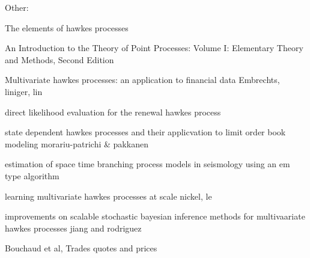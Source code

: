 \documentclass[honours,12pt]{unswthesis}
\newcommand{\CC}{\mathcal{C}}
\numberwithin{equation}{section}
\begin{document}
\begin{thebibliography}{999}
%
%
%
%
%
%
%
%
%
%
%


Other:

The elements of hawkes processes

An Introduction to the Theory of Point Processes: Volume I: Elementary Theory and Methods, Second Edition

Multivariate hawkes processes: an application to financial data
Embrechts, liniger, lin

direct likelihood evaluation for the renewal hawkes process

state dependent hawkes processes and their applicvation to limit order book modeling
morariu-patrichi \& pakkanen

estimation of space time branching process models in seismology using an em type algorithm

learning multivariate hawkes processes at scale
nickel, le

improvements on scalable stochastic bayesian inference methods for multivaariate hawkes processes
jiang and rodriguez

Bouchaud et al, Trades quotes and prices

\end{thebibliography}
\end{document}
